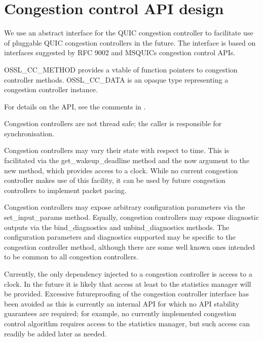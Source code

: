 \chapter{Congestion control API design}
\hypertarget{md__c_1_2_users_2namph_2_downloads_2openssl_2openssl-3_82_81_2doc_2designs_2quic-design_2congestion-control}{}\label{md__c_1_2_users_2namph_2_downloads_2openssl_2openssl-3_82_81_2doc_2designs_2quic-design_2congestion-control}
We use an abstract interface for the QUIC congestion controller to facilitate use of pluggable QUIC congestion controllers in the future. The interface is based on interfaces suggested by RFC 9002 and MSQUIC\textquotesingle{}s congestion control APIs.

{\ttfamily OSSL\+\_\+\+CC\+\_\+\+METHOD} provides a vtable of function pointers to congestion controller methods. {\ttfamily OSSL\+\_\+\+CC\+\_\+\+DATA} is an opaque type representing a congestion controller instance.

For details on the API, see the comments in {\ttfamily {}}.

Congestion controllers are not thread safe; the caller is responsible for synchronisation.

Congestion controllers may vary their state with respect to time. This is facilitated via the {\ttfamily get\+\_\+wakeup\+\_\+deadline} method and the {\ttfamily now} argument to the {\ttfamily new} method, which provides access to a clock. While no current congestion controller makes use of this facility, it can be used by future congestion controllers to implement packet pacing.

Congestion controllers may expose arbitrary configuration parameters via the {\ttfamily set\+\_\+input\+\_\+params} method. Equally, congestion controllers may expose diagnostic outputs via the {\ttfamily bind\+\_\+diagnostics} and {\ttfamily unbind\+\_\+diagnostics} methods. The configuration parameters and diagnostics supported may be specific to the congestion controller method, although there are some well known ones intended to be common to all congestion controllers.

Currently, the only dependency injected to a congestion controller is access to a clock. In the future it is likely that access at least to the statistics manager will be provided. Excessive futureproofing of the congestion controller interface has been avoided as this is currently an internal API for which no API stability guarantees are required; for example, no currently implemented congestion control algorithm requires access to the statistics manager, but such access can readily be added later as needed.

